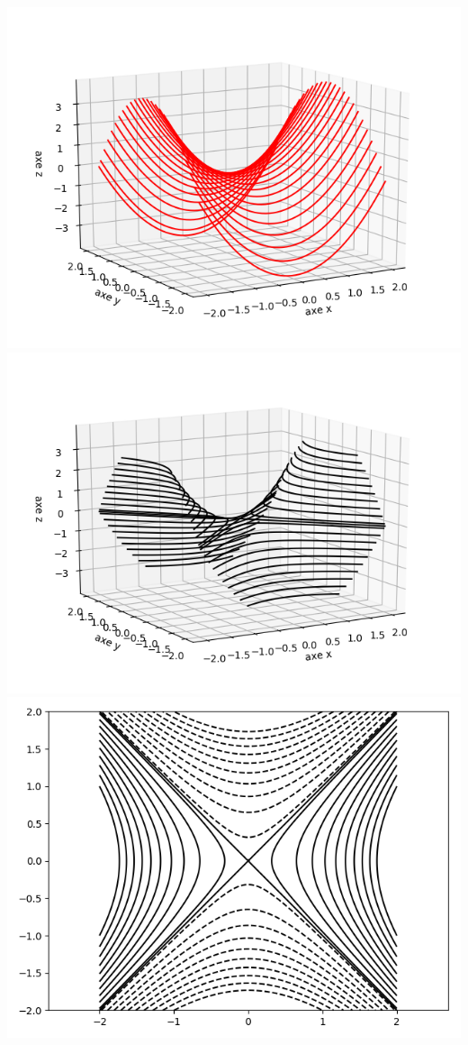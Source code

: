 \documentclass[11pt, class=report,crop=false]{standalone}
\begin{document}
\begin{exemple}
\begin{center}
    \includegraphics[scale=\myscale,scale=0.5]{figures/fonctions-quadra-3c}
    \includegraphics[scale=\myscale,scale=0.5]{figures/fonctions-quadra-3d}
    \includegraphics[scale=\myscale,scale=0.5]{figures/fonctions-quadra-3e}
\end{center}


\end{exemple}
\end{document}
